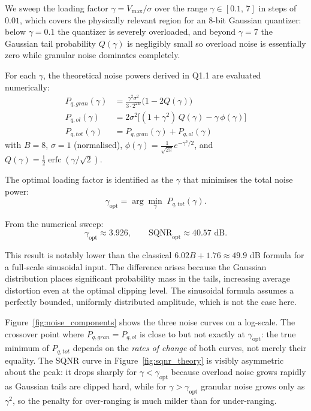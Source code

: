 \documentclass{article}
\begin{document}
We sweep the loading factor $\gamma = V_{\max}/\sigma$ over the range 
$\gamma \in [0.1,\, 7]$ in steps of $0.01$, which covers the physically 
relevant region for an 8-bit Gaussian quantizer: below $\gamma = 0.1$ the 
quantizer is severely overloaded, and beyond $\gamma = 7$ the Gaussian tail 
probability $Q(\gamma)$ is negligibly small so overload noise is essentially 
zero while granular noise dominates completely.

For each $\gamma$, the theoretical noise powers derived in Q1.1 are evaluated 
numerically:
\begin{align}
    P_{q,gran}(\gamma) &= \frac{\gamma^2 \sigma^2}{3 \cdot 2^{2B}}
                          \bigl(1 - 2Q(\gamma)\bigr) \\[6pt]
    P_{q,ol}(\gamma)   &= 2\sigma^2\bigl[(1+\gamma^2)\,Q(\gamma) 
                          - \gamma\,\phi(\gamma)\bigr] \\[6pt]
    P_{q,tot}(\gamma)  &= P_{q,gran}(\gamma) + P_{q,ol}(\gamma)
\end{align}
with $B = 8$, $\sigma = 1$ (normalised), 
$\phi(\gamma) = \frac{1}{\sqrt{2\pi}}e^{-\gamma^2/2}$, and 
$Q(\gamma) = \frac{1}{2}\operatorname{erfc}\!\left(\gamma/\sqrt{2}\right)$.

The optimal loading factor is identified as the $\gamma$ that minimises the 
total noise power:
\begin{equation}
    \gamma_{\text{opt}} = \arg\min_{\gamma}\; P_{q,tot}(\gamma).
\end{equation}

From the numerical sweep:
\begin{equation}
    \gamma_{\text{opt}} \approx 3.926, \qquad 
    \text{SQNR}_{\text{opt}} \approx 40.57 \text{ dB}.
\end{equation}

This result is notably lower than the classical $6.02B + 1.76 \approx 49.9$ 
dB formula for a full-scale sinusoidal input. The difference arises because 
the Gaussian distribution places significant probability mass in the tails, 
increasing average distortion even at the optimal clipping level. The 
sinusoidal formula assumes a perfectly bounded, uniformly distributed 
amplitude, which is not the case here.

Figure~\ref{fig:noise_components} shows the three noise curves on a 
log-scale. The crossover point where $P_{q,gran} = P_{q,ol}$ is close to but 
not exactly at $\gamma_{\text{opt}}$: the true minimum of $P_{q,tot}$ depends 
on the \emph{rates of change} of both curves, not merely their equality. The 
SQNR curve in Figure~\ref{fig:sqnr_theory} is visibly asymmetric about the 
peak: it drops sharply for $\gamma < \gamma_{\text{opt}}$ because overload 
noise grows rapidly as Gaussian tails are clipped hard, while for 
$\gamma > \gamma_{\text{opt}}$ granular noise grows only as $\gamma^2$, so 
the penalty for over-ranging is much milder than for under-ranging.
\end{document}
